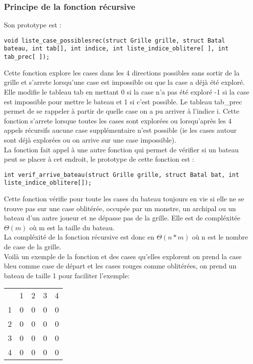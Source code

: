 \subsubsection{Principe de la fonction récursive}
Son prototype est :
\begin{lstlisting}
void liste_case_possiblesrec(struct Grille grille, struct Batal bateau, int tab[], int indice, int liste_indice_oblitere[ ], int tab_prec[ ]);
\end{lstlisting}
Cette fonction explore les cases dans les 4 directions possibles sans sortir de la grille et s'arrete lorsqu'une case est impossible ou que la case a déjà été exploré. Elle modifie le tableau tab en mettant 0 si la case n'a pas été exploré -1 si la case est impossible pour mettre le bateau et 1 si c'est possible. Le tableau tab\_prec permet de se rappeler à partir de quelle case on a pu arriver à l'indice i. Cette fonction s'arrete lorsque toutes les cases sont explorées ou lorsqu'après les 4 appels récursifs aucune case supplémentaire n'est possible (ie les cases autour sont déjà explorées ou on arrive sur une case impossible).\\
La fonction fait appel à une autre fonction qui permet de vérifier si un bateau peut se placer à cet endroit, le prototype de cette fonction est :
\begin{lstlisting}
int verif_arrive_bateau(struct Grille grille, struct Batal bat, int liste_indice_oblitere[]);
\end{lstlisting}
Cette fonction vérifie pour toute les cases du bateau toujours en vie si elle ne se trouve pas sur une case oblitérée, occupée par un monstre, un archipal ou un bateau d'un autre joueur et ne dépasse pas de la grille. Elle est de compléxitée $\Theta(m)$ où m est la taille du bateau. \\
La compléxité de la fonction récursive est donc en $\Theta(n*m)$ où n est le nombre de case de la grille. \\
Voilà un exemple de la fonction et des cases qu'elles explorent on prend la case bleu comme case de départ et les cases rouges comme oblitérées, on prend un bateau de taille 1 pour faciliter l'exemple:
\\
\begin{center}
\begin{tabular}{c|c|c|c|c|}
\multicolumn{1}{c}{} & \multicolumn{1}{c}{1} & \multicolumn{1}{c}{2} & \multicolumn{1}{c}{3} & \multicolumn{1}{c}{4}\\
\cline{2-5} 1 & 0 & \cellcolor{red}0 & 0 & 0\\
\cline{2-5} 2 & \cellcolor{red}0 & 0 & 0 & \cellcolor{red}0\\
\cline{2-5} 3 & 0 & 0 & \cellcolor{blue}0 & 0\\
\cline{2-5} 4 & 0 & 0 & 0 & 0\\
\cline{2-5}
\end{tabular}
\end{center}
